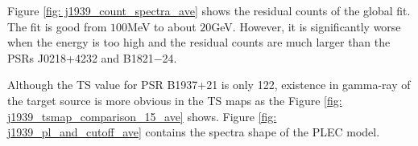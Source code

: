\documentclass[a4paper, 12pt]{report}
\begin{document}
        \begin{table}[!ht]
          \centering
            \caption[Fit parameters of the spectra model of PSR B1937+21.]
              {Fit parameters of the spectra model of PSR B1937+21. 
              The names of parameters are consistent with Equation
              \ref{eq: fermi_model}. The old results are reported by
              \citet{0004-637X-787-2-167} Note that since the paper prefers power-law model 
              than PLEC model, it does not report the photon flux of PLEC model.}
            \label{table: j1939_fit_result_ave}        
        \end{table} 

        Figure \ref{fig: j1939_count_spectra_ave} shows the residual counts of the global fit.
        The fit is good from $100$MeV to about $20$GeV. However, it is significantly worse 
        when the energy is too high and the residual counts are much larger than the PSRs 
        J0218+4232 and B1821$-$24.

        Although the TS value for PSR B1937+21 is only 122, existence in gamma-ray of the 
        target source is more obvious in the TS maps as the Figure 
        \ref{fig: j1939_tsmap_comparison_15_ave} shows. Figure 
        \ref{fig: j1939_pl_and_cutoff_ave} contains the spectra shape of the PLEC model. 
\end{document}
